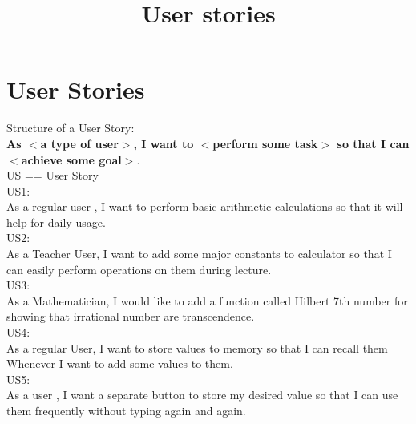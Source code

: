 \documentclass[12pt]{article}
\title{User stories}
\date{}
\begin{document}
\maketitle
\section{User Stories}

Structure of a User Story:\\

\textbf{As $<$a type of user$>$, I want to $<$perform some task$>$ so that I can $<$achieve some goal$>$}.\\


US == User Story\\

US1:\\
As a regular user , I want to perform basic arithmetic calculations so that it will help for daily usage.\\

US2:\\
As a Teacher User, I want to add some major constants to calculator so that I can easily perform operations on them during lecture.\\

US3:\\
As a Mathematician, I would like to add a function called Hilbert 7th number for showing that irrational number are transcendence.\\

US4:\\
As a regular User, I want to store values to memory so that I can recall them Whenever I want to add some values to them.\\

US5:\\
As a user , I want a separate button to store my desired value so that I can use them frequently without typing again and again. \\
\end{document}
